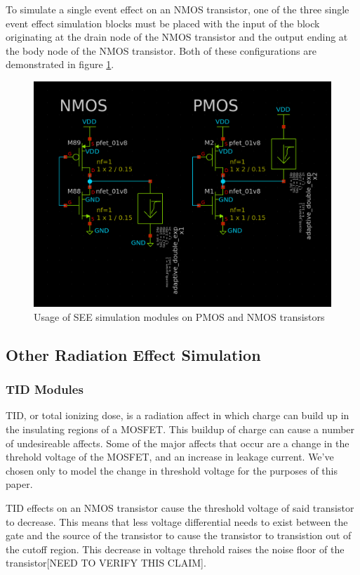 \documentclass[conference]{IEEEtran}
\begin{document}
To simulate a single event effect on an NMOS transistor, one of the three single event effect simulation blocks must be placed with the input of the block originating at the drain node of the NMOS transistor and the output ending at the body node of the NMOS transistor. Both of these configurations are demonstrated in figure \ref{fig:SEE_Usage}.

\begin{figure}[htbp]
\centering
\includegraphics[width=0.9\linewidth]{PMOS_NMOS_Usage.png}
\caption{Usage of SEE simulation modules on PMOS and NMOS transistors}
\label{fig:SEE_Usage}
\end{figure}
 
\vspace{1em}
\subsection{Other Radiation Effect Simulation}
\subsubsection{TID Modules}
TID, or total ionizing dose, is a radiation affect in which charge can build up in the insulating regions of a MOSFET. This buildup of charge can cause a number of undesireable affects. Some of the major affects that occur are a change in the threhold voltage of the MOSFET, and an increase in leakage current. We've chosen only to model the change in threshold voltage for the purposes of this paper.

TID effects on an NMOS transistor cause the threshold voltage of said transistor to decrease. This means that less voltage differential needs to exist between the gate and the source of the transistor to cause the transistor to transistion out of the cutoff region. This decrease in voltage threhold raises the noise floor of the transistor[NEED TO VERIFY THIS CLAIM].
\end{document}
